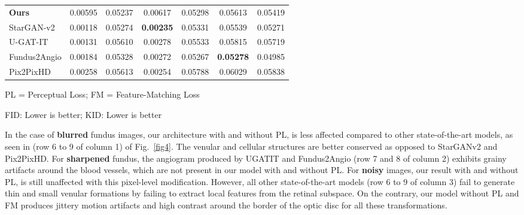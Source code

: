 \documentclass[a4paper,conference]{IEEEtran}
\begin{document}
\begin{table*}[ht]
\begin{adjustbox}{width=5.8in,totalheight=2.8in}
\begin{threeparttable}
\begin{tabular}{|l|c|c|c|c|c|c|}
    \textbf{Ours} & 0.00595 & 0.05237 &	0.00617 & 0.05298 &	0.05613 & 0.05419 \\
    StarGAN-v2 \cite{choi2020stargan} & 0.00118 & 0.05274 & \textbf{0.00235} & 0.05331 & 0.05539 & 0.05271 \\
    U-GAT-IT \cite{kim2019u} & 0.00131	& 0.05610 & 0.00278 & 0.05533 & 0.05815 & 0.05719\\
    Fundus2Angio \cite{kamran2020fundus2angio} & 0.00184 & 0.05328 & 0.00272 & 0.05267 & \textbf{0.05278} & 0.04985 \\ 
    Pix2PixHD \cite{wang2018high} & 0.00258 & 0.05613 & 0.00254 & 0.05788 & 0.06029 & 0.05838 \\ 
    \hline
    \end{tabular}
    \begin{tablenotes}
         \item[1] PL = Perceptual Loss; FM = Feature-Matching Loss
         \item[2] FID: Lower is better; KID: Lower is better
    \end{tablenotes}
\end{threeparttable}
\end{adjustbox}
\label{table1}
\end{table*}

In the case of \textbf{blurred} fundus images, our architecture with and without PL, is less affected compared to other state-of-the-art models, as seen in (row 6 to 9 of column 1) of Fig.~\ref{fig4}. The venular and cellular structures are better conserved as opposed to StarGANv2 and Pix2PixHD. For \textbf{sharpened} fundus, the angiogram produced by UGATIT and Fundus2Angio (row 7 and 8 of column 2) exhibits grainy artifacts around the blood vessels, which are not present in our model with and without PL. For \textbf{noisy} images, our result with and without PL, is still unaffected with this pixel-level modification. However, all other state-of-the-art models (row 6 to 9 of column 3) fail to generate thin and small venular formations by failing to extract local features from the retinal subspace. On the contrary, our model without PL and FM produces jittery motion artifacts and high contrast around the border of the optic disc for all these transformations.
\end{document}
